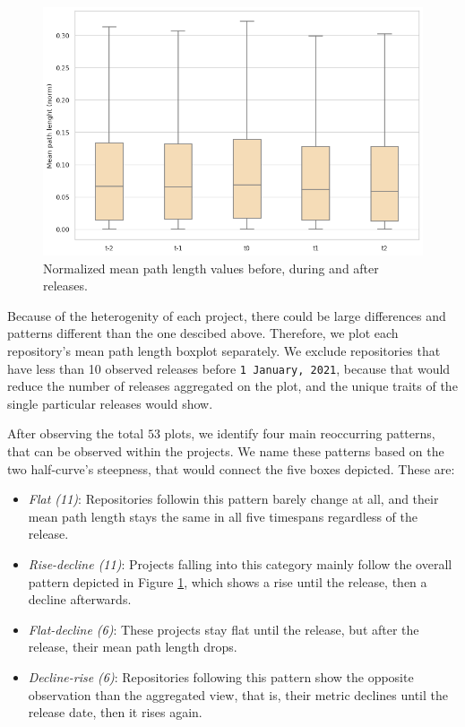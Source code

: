 \begin{figure}
    \centering
    \includegraphics[width=\textwidth]{figures/quantitative/boxplots/mean_path.png}
    \caption{Normalized mean path length values before, during and after releases.}
    \label{fig:box-mean-path}
\end{figure}

Because of the heterogenity of each project, there could be large differences and patterns different than the one descibed above. Therefore, we plot each repository's mean path length boxplot separately. We exclude repositories that have less than 10 observed releases before \texttt{1 January, 2021}, because that would reduce the number of releases aggregated on the plot, and the unique traits of the single particular releases would show.

After observing the total $53$ plots, we identify four main reoccurring patterns, that can be observed within the projects. We name these patterns based on the two half-curve's steepness, that would connect the five boxes depicted. These are:

\begin{itemize}
    \item \textit{Flat (11)}: Repositories followin this pattern barely change at all, and their mean path length stays the same in all five timespans regardless of the release.
    \item \textit{Rise-decline (11)}: Projects falling into this category mainly follow the overall pattern depicted in Figure \ref{fig:box-mean-path}, which shows a rise until the release, then a decline afterwards.
    \item \textit{Flat-decline (6)}: These projects stay flat until the release, but after the release, their mean path length drops.
    \item \textit{Decline-rise (6)}: Repositories following this pattern show the opposite observation than the aggregated view, that is, their metric declines until the release date, then it rises again.
\end{itemize}

